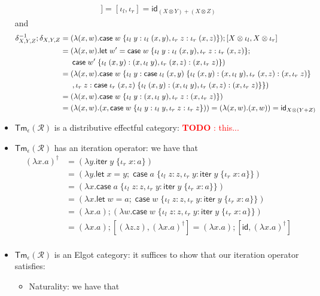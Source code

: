 \documentclass[acmsmall,screen,review]{acmart}
\newcounter{todos}
\newcommand{\todo}[1]{\stepcounter{todos} \textcolor{red}{\textbf{TODO \arabic{todos}}: #1}}
\newcommand{\mc}[1]{\ensuremath{\mathcal{#1}}}
\newcommand{\ms}[1]{\ensuremath{\mathsf{#1}}}
\newcommand{\lto}{:}
\newcommand{\linl}[1]{\iota_l\;{#1}}
\newcommand{\linr}[1]{\iota_r\;{#1}}
\newcommand{\letexpr}[3]{\ensuremath{\ms{let}\;#1 = #2;\;#3}}
\newcommand{\caseexpr}[5]{\ms{case}\;#1\;\{\linl{#2} \lto #3, \linr{#4} \lto #5\}}
\newcommand{\liter}[3]{\ms{iter}\;#1\;\{ \linr{#2} \lto #3 \}}
\begin{document}
\begin{itemize}
\begin{align*}
    ] = [\iota_l, \iota_r] = \ms{id}_{(X \otimes Y) + (X \otimes Z)}
  \end{align*}
  and
  \begin{align*}
    \delta^{-1}_{X, Y, Z} ; \delta_{X, Y, Z}
    &= (\lambda (x, w) .  \caseexpr{w}{y}{\linl{(x, y)}}{z}{\linr{(x, z)}})
      ; [X \otimes \iota_l, X \otimes \iota_r] \\
    &= (\lambda (x, w) . \letexpr{w'}{\caseexpr{w}{y}{\linl{(x, y)}}{z}{\linr{(x, z)}}}{ 
      \\ & \quad\;\;
      \caseexpr{w'}{(x, y)}{(x, \linl{y})}{(x, z)}{(x, \linr{z})}}) \\
    &= (\lambda (x, w) . \caseexpr{w}
      {y}{\caseexpr{\linl{(x, y)}}{(x, y)}{(x, \linl{y})}{(x, z)}{(x, \linr{z})} \\ & \quad\;\;}
      {z}{\caseexpr{\linr{(x, z)}}{(x, y)}{(x, \linl{y})}{(x, z)}{(x, \linr{z})}}
    ) \\
    &= (\lambda (x, w) . \caseexpr{w}{y}{(x, \linl{y})}{z}{(x, \linr{z})}) \\
    &= (\lambda (x, w) . (x, \caseexpr{w}{y}{\linl{y}}{z}{\linr{z}}))
    = (\lambda (x, w) . (x, w)) = \ms{id}_{X \otimes (Y + Z)}
  \end{align*}
  \item $\ms{Tm}_\epsilon(\mc{R})$ is a distributive effectful category: \todo{this...}
  \item $\ms{Tm}_\epsilon(\mc{R})$ has an iteration operator: we have that
  \begin{align*}
    (\lambda x . a)^\dagger
    &= (\lambda y . \liter{y}{x}{a}) \\
    &= (\lambda y . \letexpr{x}{y}{\caseexpr{a}{z}{z}{y}{\liter{y}{x}{a}}}) \\
    &= (\lambda x . \caseexpr{a}{z}{z}{y}{\liter{y}{x}{a}}) \\
    &= (\lambda x . \letexpr{w}{a}{\caseexpr{w}{z}{z}{y}{\liter{y}{x}{a}}}) \\
    &= (\lambda x . a) ; (\lambda w . \caseexpr{w}{z}{z}{y}{\liter{y}{x}{a}}) \\
    &= (\lambda x . a) ; [(\lambda z.z), (\lambda x.a)^\dagger]
    = (\lambda x.a) ; [\ms{id}, (\lambda x.a)^\dagger] \\
  \end{align*}
  \item $\ms{Tm}_\epsilon(\mc{R})$ is an Elgot category: it suffices to show that our iteration
  operator satisfies:
  \begin{itemize}
    \item Naturality: we have that

\end{itemize}
\end{itemize}
\end{document}
